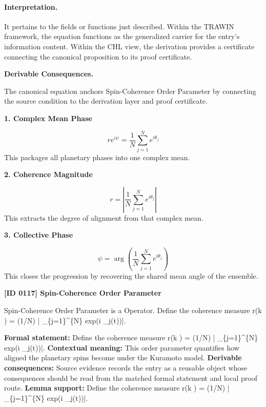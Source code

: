 \paragraph{Interpretation.}
It pertains to the fields or functions just described. Within the TRAWIN framework, the equation functions as the generalized carrier for the entry’s information content. Within the CHL view, the derivation provides a certificate connecting the canonical proposition to its proof certificate.

\par\vspace{0.35em}
\noindent\textbf{Derivable Consequences.}\quad
\begingroup
\footnotesize
\raggedright
The canonical equation anchors Spin-Coherence Order Parameter by connecting the source condition to the derivation layer and proof certificate.
\par\endgroup

\noindent\textbf{1. Complex Mean Phase}\par
\[
r e^{i\psi} = \frac{1}{N}\sum_{j=1}^{N} e^{i\theta_j}
\]
\noindent This packages all planetary phases into one complex mean.\par
\noindent\textbf{2. Coherence Magnitude}\par
\[
r = \left|\frac{1}{N}\sum_{j=1}^{N} e^{i\theta_j}\right|
\]
\noindent This extracts the degree of alignment from that complex mean.\par
\noindent\textbf{3. Collective Phase}\par
\[
\psi = \arg\!\left(\frac{1}{N}\sum_{j=1}^{N} e^{i\theta_j}\right)
\]
\noindent This closes the progression by recovering the shared mean angle of the ensemble.\par

\clearpage
\noindent\textbf{[ID 0117] Spin-Coherence Order Parameter}\par
\vspace{0.35em}
\begingroup\small
{}
Spin-Coherence Order Parameter is a Operator. Define the coherence measure r(k ) = (1/N)   | \_\{j=1\}\textasciicircum{}\{N\} exp(i  \_j(t))|.

\begingroup\footnotesize\setlength{\emergencystretch}{3em}\sloppy
\textbf{Formal statement:} Define the coherence measure r(k ) = (1/N)   | \_\{j=1\}\textasciicircum{}\{N\} exp(i  \_j(t))|.
\textbf{Contextual meaning:} This order parameter quantifies how aligned the planetary spins become under the Kuramoto model.
\textbf{Derivable consequences:} Source evidence records the entry as a reusable object whose consequences should be read from the matched formal statement and local proof route.
\textbf{Lemma support:} Define the coherence measure r(k ) = (1/N)   | \_\{j=1\}\textasciicircum{}\{N\} exp(i  \_j(t))|.\par
\endgroup

